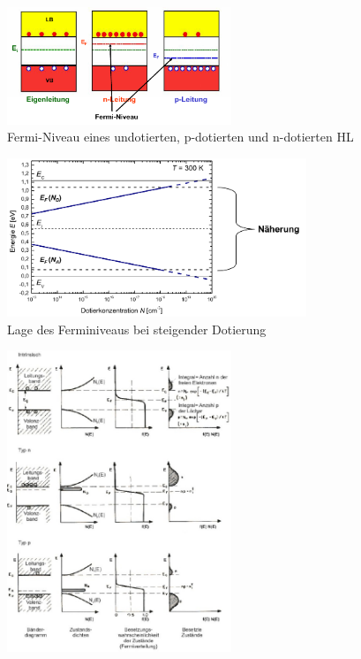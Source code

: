 		\begin{figure}[h!]
			\centering
			\includegraphics[width=0.6\textwidth]{Kapitel/Kap04/fermiNiveau.png}
			\caption{Fermi-Niveau eines undotierten, p-dotierten und n-dotierten HL}
			\label{04_fermiNiveau}
		\end{figure}
	
		\begin{figure}[h!]
			\centering
			\includegraphics[width=0.8\textwidth]{Kapitel/Kap04/lageFerminiveauSi.png}
			\caption{Lage des Ferminiveaus bei steigender Dotierung}
			\label{04_lageFermiNiveau}
		\end{figure}
	
		\clearpage
			
		\begin{figure}[h!]
			\centering
			\includegraphics[width=0.6\textwidth]{Kapitel/Kap04/zustandsdichte.png}
			\caption{}
			\label{04_zustandsdichte}
		\end{figure}
		
